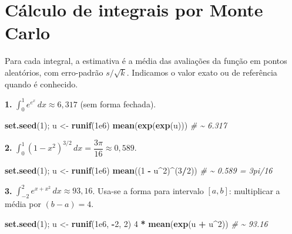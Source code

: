 \documentclass[
  portuguese,
  11pt,
  openany]{book}
\newenvironment{Shaded}{\begin{snugshade}}{\end{snugshade}}
\newcommand{\CommentTok}[1]{\textcolor[rgb]{0.56,0.35,0.01}{\textit{#1}}}
\newcommand{\DecValTok}[1]{\textcolor[rgb]{0.00,0.00,0.81}{#1}}
\newcommand{\FloatTok}[1]{\textcolor[rgb]{0.00,0.00,0.81}{#1}}
\newcommand{\FunctionTok}[1]{\textcolor[rgb]{0.13,0.29,0.53}{\textbf{#1}}}
\newcommand{\NormalTok}[1]{#1}
\newcommand{\OtherTok}[1]{\textcolor[rgb]{0.56,0.35,0.01}{#1}}
\newcommand{\SpecialCharTok}[1]{\textcolor[rgb]{0.81,0.36,0.00}{\textbf{#1}}}
\begin{document}
\section{Cálculo de integrais por Monte Carlo}\label{cuxe1lculo-de-integrais-por-monte-carlo}

Para cada integral, a estimativa é a média das avaliações da função em pontos
aleatórios, com erro-padrão \(s/\sqrt{k}\). Indicamos o valor exato ou de
referência quando é conhecido.

\textbf{1.} \(\int_0^1 e^{e^x}\,dx \approx 6{,}317\) (sem forma fechada).

\begin{Shaded}
\begin{Highlighting}[]
\FunctionTok{set.seed}\NormalTok{(}\DecValTok{1}\NormalTok{); u }\OtherTok{\textless{}{-}} \FunctionTok{runif}\NormalTok{(}\FloatTok{1e6}\NormalTok{)}
\FunctionTok{mean}\NormalTok{(}\FunctionTok{exp}\NormalTok{(}\FunctionTok{exp}\NormalTok{(u)))          }\CommentTok{\# \textasciitilde{} 6.317}
\end{Highlighting}
\end{Shaded}

\textbf{2.} \(\int_0^1 (1-x^2)^{3/2}\,dx = \dfrac{3\pi}{16} \approx 0{,}589\).

\begin{Shaded}
\begin{Highlighting}[]
\FunctionTok{set.seed}\NormalTok{(}\DecValTok{1}\NormalTok{); u }\OtherTok{\textless{}{-}} \FunctionTok{runif}\NormalTok{(}\FloatTok{1e6}\NormalTok{)}
\FunctionTok{mean}\NormalTok{((}\DecValTok{1} \SpecialCharTok{{-}}\NormalTok{ u}\SpecialCharTok{\^{}}\DecValTok{2}\NormalTok{)}\SpecialCharTok{\^{}}\NormalTok{(}\DecValTok{3}\SpecialCharTok{/}\DecValTok{2}\NormalTok{))      }\CommentTok{\# \textasciitilde{} 0.589 = 3pi/16}
\end{Highlighting}
\end{Shaded}

\textbf{3.} \(\int_{-2}^{2} e^{x + x^2}\,dx \approx 93{,}16\). Usa-se a forma para
intervalo \([a,b]\): multiplicar a média por \((b-a) = 4\).

\begin{Shaded}
\begin{Highlighting}[]
\FunctionTok{set.seed}\NormalTok{(}\DecValTok{1}\NormalTok{); u }\OtherTok{\textless{}{-}} \FunctionTok{runif}\NormalTok{(}\FloatTok{1e6}\NormalTok{, }\SpecialCharTok{{-}}\DecValTok{2}\NormalTok{, }\DecValTok{2}\NormalTok{)}
\DecValTok{4} \SpecialCharTok{*} \FunctionTok{mean}\NormalTok{(}\FunctionTok{exp}\NormalTok{(u }\SpecialCharTok{+}\NormalTok{ u}\SpecialCharTok{\^{}}\DecValTok{2}\NormalTok{))     }\CommentTok{\# \textasciitilde{} 93.16}
\end{Highlighting}
\end{Shaded}
\end{document}
